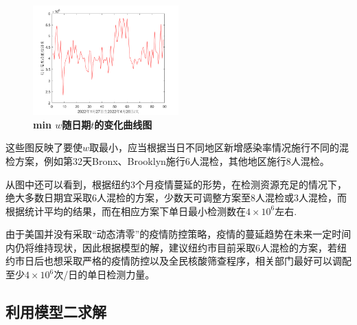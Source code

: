 \documentclass[withoutpreface,bwprint]{cumcmthesis} %
\begin{document}
\begin{figure}[H]
\centering
\includegraphics[width=0.5\textwidth]{fig_pro22.png}
\caption{\textbf{\rm{min} $w$随日期$t$的变化曲线图}}
\label{pro1}
\end{figure}

这些图反映了要使$w$取最小，应当根据当日不同地区新增感染率情况施行不同的混检方案，例如第32天Bronx、Brooklyn施行6人混检，其他地区施行8人混检。

从图中还可以看到，根据纽约3个月疫情蔓延的形势，在检测资源充足的情况下，绝大多数日期宜采取6人混检的方案，少数天可调整方案至8人混检或3人混检，而根据统计平均的结果，而在相应方案下单日最小检测数在$4 \times 10^6$左右.

由于美国并没有采取“动态清零”的疫情防控策略，疫情的蔓延趋势在未来一定时间内仍将维持现状，因此根据模型的解，建议纽约市目前采取6人混检的方案，若纽约市日后也想采取严格的疫情防控以及全民核酸筛查程序，相关部门最好可以调配至少$4 \times 10^6$次/日的单日检测力量。

\subsection{利用模型二求解}
\end{document}
